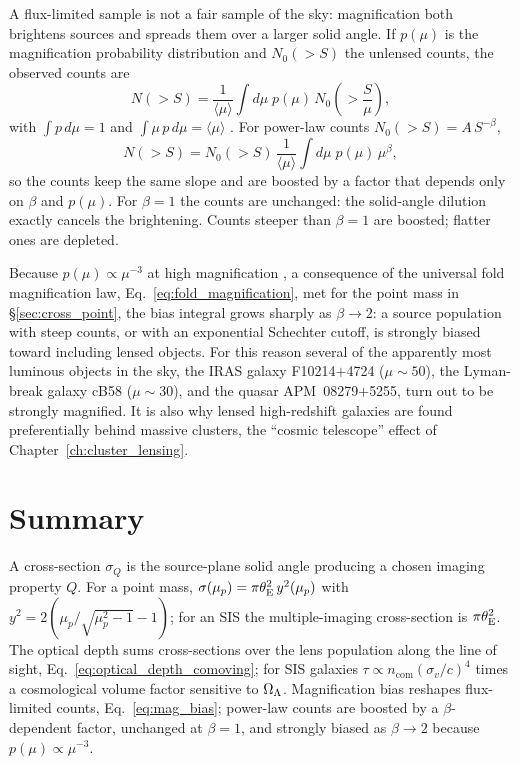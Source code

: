 A flux-limited sample is not a fair sample of the sky: magnification both
brightens sources and spreads them over a larger solid angle.  If $p(\mu)$
is the magnification probability distribution and $N_0(>S)$ the unlensed
counts, the observed counts are
\begin{equation}
    N(>S) = \frac{1}{\langle\mu\rangle}
        \int d\mu\; p(\mu)\, N_0\!\left(> \frac{S}{\mu}\right),
    \label{eq:mag_bias}
\end{equation}
with $\int p\,d\mu = 1$ and $\int \mu\,p\,d\mu = \langle\mu\rangle$
\citep[][Part~1, \S5.3]{schneider_kochanek_wambsganss_2006}.  For
power-law counts
$N_0(>S) = A\,S^{-\beta}$,
\begin{equation}
    N(>S) = N_0(>S)\,
        \frac{1}{\langle\mu\rangle}\int d\mu\; p(\mu)\,\mu^{\beta},
    \label{eq:mag_bias_powerlaw}
\end{equation}
so the counts keep the same slope and are boosted by a factor that
depends only on $\beta$ and $p(\mu)$.  For $\beta = 1$ the
counts are unchanged: the solid-angle dilution exactly cancels the
brightening.  Counts steeper than $\beta = 1$ are boosted; flatter ones
are depleted.

Because $p(\mu) \propto \mu^{-3}$ at high magnification
\citep{blandford_narayan_1986}, a consequence of the universal fold
magnification law, Eq.~\eqref{eq:fold_magnification}, met for the point
mass in \S\ref{sec:cross_point}, the bias integral grows sharply as
$\beta \to 2$: a source population with steep counts, or with an
exponential Schechter cutoff, is strongly biased toward including lensed
objects.  For this reason several of the apparently most luminous
objects in the sky, the IRAS galaxy F10214$+$4724 ($\mu \sim 50$), the
Lyman-break galaxy cB58 ($\mu \sim 30$), and the quasar
APM~08279$+$5255, turn out to be strongly magnified.  It is also why lensed high-redshift
galaxies are found preferentially behind massive clusters, the
``cosmic telescope'' effect of Chapter~\ref{ch:cluster_lensing}.


\section{Summary}
\label{sec:statistics_summary}

A cross-section $\sigma_Q$ is the source-plane solid angle producing
a chosen imaging property $Q$.  For a point mass,
$\sigma(\mu_p) = \pi\theta_{\mathrm{E}}^2\,y^2(\mu_p)$ with
$y^2 = 2(\mu_p/\sqrt{\mu_p^2-1}-1)$; for an SIS the multiple-imaging
cross-section is $\pi\theta_{\mathrm{E}}^2$.  The optical depth sums
cross-sections over the lens population along the line of sight,
Eq.~\eqref{eq:optical_depth_comoving}; for SIS galaxies
$\tau \propto n_{\mathrm{com}}(\sigma_v/c)^4$ times a cosmological
volume factor sensitive to $\Omega_{\Lambda}$.  Magnification bias reshapes
flux-limited counts, Eq.~\eqref{eq:mag_bias}; power-law counts are
boosted by a $\beta$-dependent factor, unchanged at $\beta = 1$, and
strongly biased as $\beta \to 2$ because $p(\mu) \propto \mu^{-3}$.


